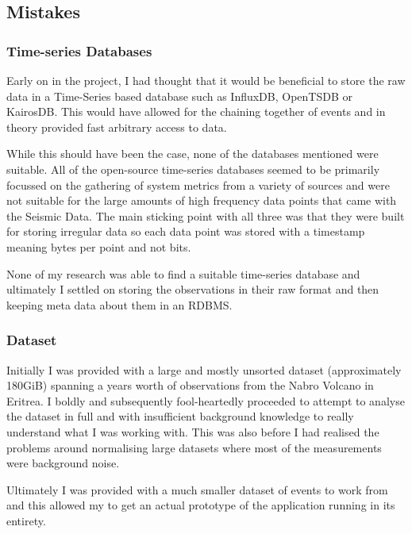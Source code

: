 \documentclass[../report.tex]{subfiles}
\begin{document}
\subsection{Mistakes}
\subsubsection{Time-series Databases}
	Early on in the project, I had thought that it would be beneficial to store the raw data in a Time-Series based database such as InfluxDB, OpenTSDB or KairosDB.  This would have allowed for the chaining together of events and in theory provided fast arbitrary access to data.
	
	While this should have been the case, none of the databases mentioned were suitable.  All of the open-source time-series databases seemed to be primarily focussed on the gathering of system metrics from a variety of sources and were not suitable for the large amounts of high frequency data points that came with the Seismic Data.  The main sticking point with all three was that they were built for storing irregular data so each data point was stored with a timestamp meaning bytes per point and not bits.
	
	None of my research was able to find a suitable time-series database and ultimately I settled on storing the observations in their raw format and then keeping meta data about them in an RDBMS.
	
\subsubsection{Dataset}
	Initially I was provided with a large and mostly unsorted dataset (approximately 180GiB) spanning a years worth of observations from the Nabro Volcano in Eritrea.  I boldly and subsequently fool-heartedly proceeded to attempt to analyse the dataset in full and with insufficient background knowledge to really understand what I was working with.  This was also before I had realised the problems around normalising large datasets where most of the measurements were background noise.
	
	Ultimately I was provided with a much smaller dataset of events to work from and this allowed my to get an actual prototype of the application running in its entirety.
	
\end{document}
